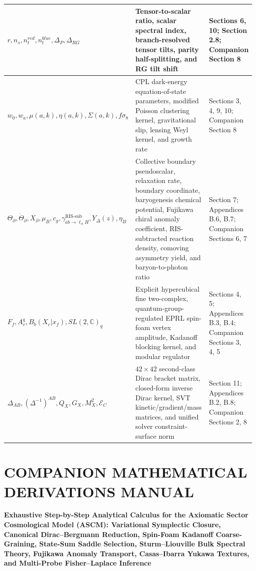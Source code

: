 \documentclass[aps,prd,onecolumn,superscriptaddress,nofootinbib,longbibliography,10pt]{revtex4-2}
\begin{document}
\begin{center}
\begin{tabular}{|lll|}
      \(r, n_s, n_t^{red}, n_t^{blue}, \Delta_P, \Delta_{RG}\) & Tensor-to-scalar ratio, scalar spectral index, branch-resolved tensor tilts, parity half-splitting, and RG tilt shift & Sections 6, 10; Section 2.8; Companion Section 8 \\ \hline

      \(w_0, w_a, \mu(a,k), \eta(a,k), \Sigma(a,k), f\sigma_8\) & CPL dark-energy equation-of-state parameters, modified Poisson clustering kernel, gravitational slip, lensing Weyl kernel, and growth rate & Sections 3, 4, 9, 10; Companion Section 8 \\ \hline

      \(\Theta_\partial, \dot{\Theta}_\partial, X_\partial, \mu_B, c_g, \gamma_{ab\to\ell_\alpha H}^{\text{RIS-sub}}, Y_\Delta(z), \eta_B\) & Collective boundary pseudoscalar, relaxation rate, boundary coordinate, baryogenesis chemical potential, Fujikawa chiral anomaly coefficient, RIS-subtracted reaction density, comoving asymmetry yield, and baryon-to-photon ratio & Section 7; Appendices B.6, B.7; Companion Sections 6, 7 \\ \hline

      \(F_f, A_v^q, B_b(X_c|x_f), SL(2,\mathbb{C})_q\) & Explicit hypercubical fine two-complex, quantum-group-regulated EPRL spin-foam vertex amplitude, Kadanoff blocking kernel, and modular regulator & Sections 4, 5; Appendices B.3, B.4; Companion Sections 3, 4, 5 \\ \hline

      \(\Delta_{AB}, (\Delta^{-1})^{AB}, Q_X, G_X, M_X^2, \mathcal{E}_C\) & \(42 \times 42\) second-class Dirac bracket matrix, closed-form inverse Dirac kernel, SVT kinetic/gradient/mass matrices, and unified solver constraint-surface norm & Section 11; Appendices B.2, B.8; Companion Sections 2, 8 \\ \hline

    
  \end{tabular}
\end{center}











 

  
\section*{COMPANION MATHEMATICAL DERIVATIONS MANUAL}

  \textbf{Exhaustive Step-by-Step Analytical Calculus for the Axiomatic Sector Cosmological Model (ASCM): Variational Symplectic Closure, Canonical Dirac–Bergmann Reduction, Spin-Foam Kadanoff Coarse-Graining, State-Sum Saddle Selection, Sturm–Liouville Bulk Spectral Theory, Fujikawa Anomaly Transport, Casas–Ibarra Yukawa Textures, and Multi-Probe Fisher–Laplace Inference}
\end{document}
